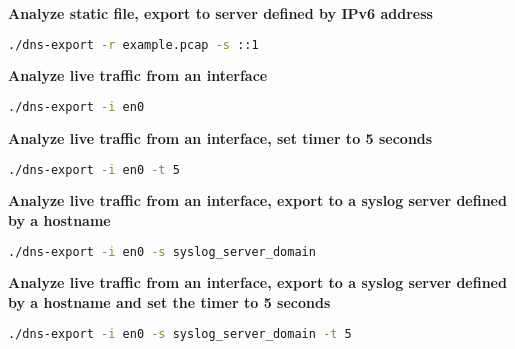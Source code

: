 \vspace{0.5cm}
\textbf{Analyze static file, export to server defined by IPv6 address}
\begin{lstlisting}[language=Bash] 
./dns-export -r example.pcap -s ::1
\end{lstlisting}

\vspace{0.5cm}
\textbf{Analyze live traffic from an interface}
\begin{lstlisting}[language=Bash] 
./dns-export -i en0
\end{lstlisting}

\vspace{0.5cm}
\textbf{Analyze live traffic from an interface, set timer to 5 seconds}
\begin{lstlisting}[language=Bash] 
./dns-export -i en0 -t 5
\end{lstlisting}

\vspace{0.5cm}
\textbf{Analyze live traffic from an interface, export to a syslog server defined by a hostname}
\begin{lstlisting}[language=Bash] 
./dns-export -i en0 -s syslog_server_domain
\end{lstlisting}

\vspace{0.5cm}
\textbf{Analyze live traffic from an interface, export to a syslog server defined by a hostname and set the timer to 5 seconds}
\begin{lstlisting}[language=Bash] 
./dns-export -i en0 -s syslog_server_domain -t 5
\end{lstlisting}

